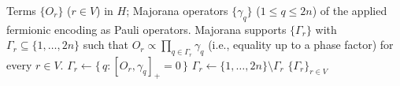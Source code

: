 \documentclass[%
 aip,
 amsmath,amssymb,
 reprint,%
]{revtex4-1}
\newcommand{\ac}[2]{[#1, #2]_+}    %
\newcommand{\supp}{\Gamma}               %
\begin{document}
\begin{algorithm}[htbp]
\caption{Majorana supports of the terms in an $n$-mode encoded Hamiltonian $H$. Any Majorana operator $\gamma_q$ (represented by a Pauli operator) anticommutes with $\prod_{q'\in\supp}\gamma_{q'}$ when $q\in\supp$ and $|\supp|$ is even, or $q\notin\supp$ and $|\supp|$ is odd. All Majorana operators that anticommute with a Pauli-operator term $O_r$ therefore form an (index-set) support or a support complement of $O_r$, depending on the parity of those Majorana operators.}
\label{alg:supports}
\begin{algorithmic}[1]
\Require Terms $\{O_r\}$ ($r\in V$) in $H$; Majorana operators $\{\gamma_q\}$ ($1\leq q \leq 2n$) of the applied fermionic encoding as Pauli operators.
\Ensure Majorana supports $\{\supp_r\}$ with $\supp_r\subseteq\{1,\dots,2n\}$ such that
        $O_r\propto\prod_{q\in\supp_r}\gamma_q$ (i.e., equality up to a phase factor) for every $r\in V$.
    \State $\supp_r\gets\{\,q : \ac{O_r}{\gamma_q}=0\,\}$
    \If{$|\supp_r|$ is odd} $\supp_r\gets\{1,\dots,2n\}\setminus\supp_r$
    \EndIf
  \EndFor
  \State \Return $\{\supp_r\}_{r\in V}$
\EndProcedure
\end{algorithmic}
\end{algorithm}
\end{document}
